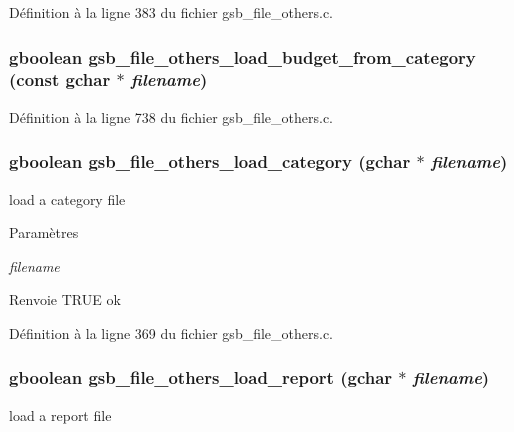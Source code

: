 Définition à la ligne 383 du fichier gsb\_\-file\_\-others.c.

\subsubsection[{gsb\_\-file\_\-others\_\-load\_\-budget\_\-from\_\-category}]{\setlength{\rightskip}{0pt plus 5cm}gboolean gsb\_\-file\_\-others\_\-load\_\-budget\_\-from\_\-category (const gchar $\ast$ {\em filename})}\label{gsb__file__others_8h_a8abf9e286be97d09b1c8b6d9197ee74f}


Définition à la ligne 738 du fichier gsb\_\-file\_\-others.c.

\subsubsection[{gsb\_\-file\_\-others\_\-load\_\-category}]{\setlength{\rightskip}{0pt plus 5cm}gboolean gsb\_\-file\_\-others\_\-load\_\-category (gchar $\ast$ {\em filename})}\label{gsb__file__others_8h_a0cdca31242b817da6c6a18839e41ec90}
load a category file


\begin{DoxyParams}{Paramètres}
\item[{\em filename}]\end{DoxyParams}
\begin{DoxyReturn}{Renvoie}
TRUE ok 
\end{DoxyReturn}


Définition à la ligne 369 du fichier gsb\_\-file\_\-others.c.

\subsubsection[{gsb\_\-file\_\-others\_\-load\_\-report}]{\setlength{\rightskip}{0pt plus 5cm}gboolean gsb\_\-file\_\-others\_\-load\_\-report (gchar $\ast$ {\em filename})}\label{gsb__file__others_8h_a03383737bac0b4cf40a29a702019457f}
load a report file


